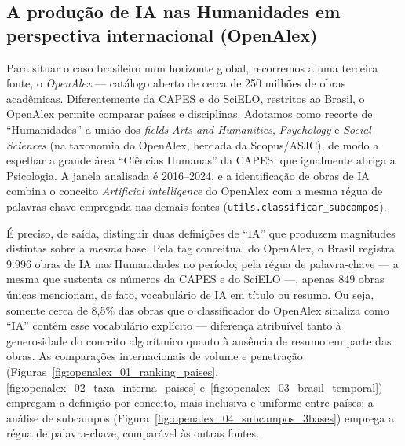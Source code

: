 %

\subsection{A produção de IA nas Humanidades em perspectiva internacional (OpenAlex)}

Para situar o caso brasileiro num horizonte global, recorremos a uma terceira
fonte, o \textit{OpenAlex} --- catálogo aberto de cerca de 250 milhões de obras
acadêmicas. Diferentemente da CAPES e do SciELO, restritos ao Brasil,
o OpenAlex permite comparar países e disciplinas. Adotamos como recorte de
``Humanidades'' a união dos \textit{fields} \textit{Arts and Humanities},
\textit{Psychology} e \textit{Social Sciences} (na taxonomia do OpenAlex,
herdada da Scopus/ASJC), de modo a espelhar a grande área ``Ciências Humanas''
da CAPES, que igualmente abriga a Psicologia. A janela analisada é
2016--2024, e a identificação de obras de IA combina o conceito
\textit{Artificial intelligence} do OpenAlex com a mesma régua de palavras-chave
empregada nas demais fontes (\texttt{utils.classificar\_subcampos}).

É preciso, de saída, distinguir duas definições de ``IA'' que produzem
magnitudes distintas sobre a \emph{mesma} base. Pela tag conceitual do OpenAlex,
o Brasil registra 9.996 obras de IA nas Humanidades no período; pela régua de
palavra-chave --- a mesma que sustenta os números da CAPES e do
SciELO ---, apenas 849 obras únicas mencionam, de fato, vocabulário de IA em
título ou resumo. Ou seja, somente cerca de 8,5\% das obras que o classificador
do OpenAlex sinaliza como ``IA'' contêm esse vocabulário explícito --- diferença
atribuível tanto à generosidade do conceito algorítmico quanto à ausência de
resumo em parte das obras. As comparações internacionais de volume e penetração
(Figuras~\ref{fig:openalex_01_ranking_paises},
\ref{fig:openalex_02_taxa_interna_paises}
e~\ref{fig:openalex_03_brasil_temporal}) empregam a definição por conceito, mais
inclusiva e uniforme entre países; a análise de subcampos
(Figura~\ref{fig:openalex_04_subcampos_3bases}) emprega a régua de
palavra-chave, comparável às outras fontes.

